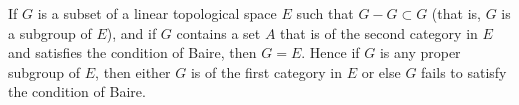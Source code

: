 If $G$ is a subset of a linear topological space $E$ such that $G - G \subset G$ (that is, $G$ is a subgroup of $E$), and if $G$ contains a set $A$ that is of the second category in $E$ and satisfies the condition of Baire, then $G = E$. Hence if $G$ is any proper subgroup of $E$, then either $G$ is of the first category in $E$ or else $G$ fails to satisfy the condition of Baire.
